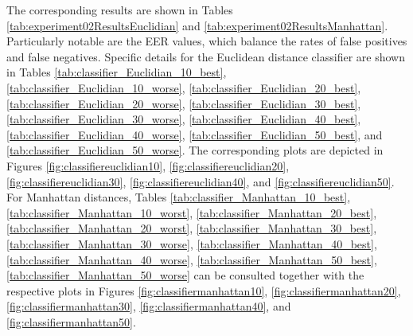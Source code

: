 		
		
		\FloatBarrier
		
		\par The corresponding results are shown in Tables \ref{tab:experiment02ResultsEuclidian} and \ref{tab:experiment02ResultsManhattan}. Particularly notable are the EER values, which balance the rates of false positives and false negatives. Specific details for the Euclidean distance classifier are shown in Tables \ref{tab:classifier_Euclidian_10_best}, \ref{tab:classifier_Euclidian_10_worse},
		\ref{tab:classifier_Euclidian_20_best}, \ref{tab:classifier_Euclidian_20_worse}, 
		\ref{tab:classifier_Euclidian_30_best}, \ref{tab:classifier_Euclidian_30_worse}, 
		\ref{tab:classifier_Euclidian_40_best}, \ref{tab:classifier_Euclidian_40_worse}, 
		\ref{tab:classifier_Euclidian_50_best},  and \ref{tab:classifier_Euclidian_50_worse}. The corresponding plots are depicted in Figures \ref{fig:classifiereuclidian10}, \ref{fig:classifiereuclidian20}, \ref{fig:classifiereuclidian30}, \ref{fig:classifiereuclidian40}, and \ref{fig:classifiereuclidian50}. For Manhattan distances,  Tables \ref{tab:classifier_Manhattan_10_best}, \ref{tab:classifier_Manhattan_10_worst}, 
		\ref{tab:classifier_Manhattan_20_best}, \ref{tab:classifier_Manhattan_20_worst}, 
		\ref{tab:classifier_Manhattan_30_best}, \ref{tab:classifier_Manhattan_30_worse}, 
		\ref{tab:classifier_Manhattan_40_best}, \ref{tab:classifier_Manhattan_40_worse}, 
		\ref{tab:classifier_Manhattan_50_best},
		\ref{tab:classifier_Manhattan_50_worse} 
		can be consulted together with the respective plots in Figures \ref{fig:classifiermanhattan10}, \ref{fig:classifiermanhattan20}, \ref{fig:classifiermanhattan30}, \ref{fig:classifiermanhattan40}, and \ref{fig:classifiermanhattan50}.

		
		
		
		
		
		
		
		
		
		

